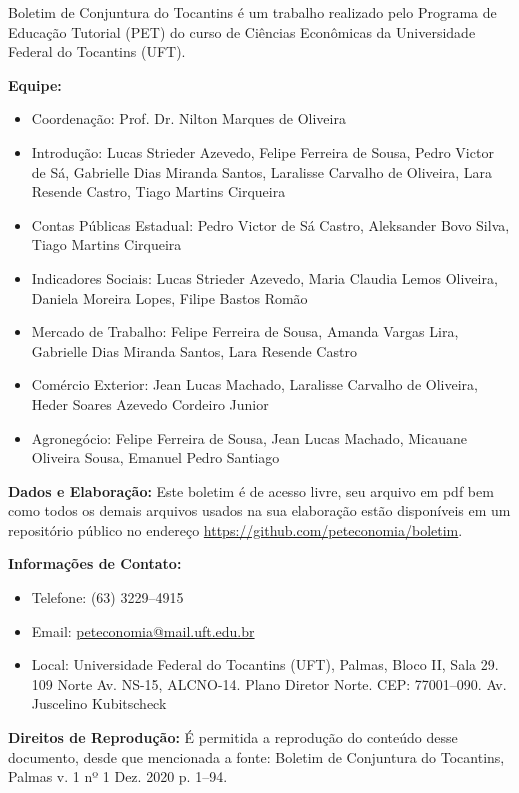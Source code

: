 \begin{tcolorbox}[colback=boxbackground, colframe=boxbackground, arc=0mm, top=15pt]
Boletim de Conjuntura do Tocantins é um trabalho realizado pelo Programa de Educação Tutorial (PET) do curso de Ciências Econômicas da Universidade Federal do Tocantins (UFT).
\\
\par{\bf Equipe:}
\begin{itemize}
	\item{Coordenação:} Prof. Dr. Nilton Marques de Oliveira
	\item{Introdução:} Lucas Strieder Azevedo, Felipe Ferreira de Sousa, Pedro Victor de Sá, Gabrielle Dias Miranda Santos, Laralisse Carvalho de Oliveira, Lara Resende Castro, Tiago Martins Cirqueira
	\item{Contas Públicas Estadual:} Pedro Victor de Sá Castro, Aleksander Bovo Silva, Tiago Martins Cirqueira
	\item{Indicadores Sociais:} Lucas Strieder Azevedo, Maria Claudia Lemos Oliveira, Daniela Moreira Lopes, Filipe Bastos Romão
	\item{Mercado de Trabalho:} Felipe Ferreira de Sousa, Amanda Vargas Lira, Gabrielle Dias Miranda Santos, Lara Resende Castro
	\item{Comércio Exterior:} Jean Lucas Machado,  Laralisse Carvalho de Oliveira, Heder Soares Azevedo Cordeiro Junior
	\item{Agronegócio:} Felipe Ferreira de Sousa, Jean Lucas Machado, Micauane Oliveira Sousa, Emanuel Pedro Santiago
\end{itemize}
\par{\bf Dados e Elaboração:}
Este boletim é de acesso livre, seu arquivo em pdf bem como todos os demais arquivos usados na sua elaboração estão disponíveis em um repositório público no endereço \url{https://github.com/peteconomia/boletim}.
\\
\par{\bf Informações de Contato:}
\begin{itemize}
	\item{Telefone:} (63) 3229--4915
	\item{Email:} \url{peteconomia@mail.uft.edu.br}
	\item{Local:} Universidade Federal do Tocantins (UFT), Palmas, Bloco II, Sala 29. 109 Norte Av. NS-15, ALCNO-14. Plano Diretor Norte. CEP: 77001--090. Av. Juscelino Kubitscheck
\end{itemize}
\par{\bf Direitos de Reprodução:}
É permitida a reprodução do conteúdo desse documento, desde que mencionada a fonte: Boletim de Conjuntura do Tocantins, Palmas v. 1 nº 1 Dez. 2020 p. 1--94.
\end{tcolorbox}